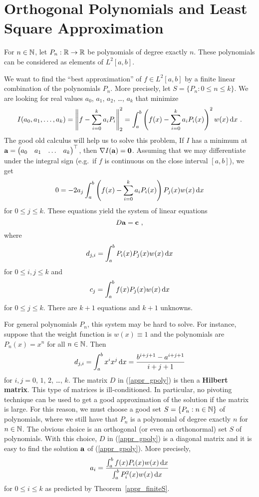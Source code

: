 \section{Orthogonal Polynomials and Least Square Approximation} 

For $n\in \mathbb{N}$, let $P_n:\mathbb{R}\rightarrow \mathbb{R}$ be polynomials of degree
exactly $n$.  These polynomials can be considered as elements of
$L^2[a,b]$.

We want to find the ``best approximation'' of $f\in L^2[a,b]$ by a finite
linear combination of the polynomials $P_n$.  More precisely, let
$\displaystyle S = \{ P_n : 0 \leq n \leq k \}$.  We are looking for 
real values $a_0$, $a_1$, $a_2$, \ldots, $a_k$ that minimize
\[
I(a_0,a_1,\ldots, a_k) = \left\| f - \sum_{i=0}^k a_i P_i \right\|_2^2
= \int_a^b \left( f(x) - \sum_{i=0}^k a_i P_i(x) \right)^2 w(x)\,\mathrm{d}x \  .
\]
The good old calculus will help us to solve this problem,  If $I$ has a
minimum at
$\displaystyle \mathbf{a} = \begin{pmatrix}
a_0 & a_1 & \ldots & a_k \end{pmatrix}^\top$,
then $\nabla I (\mathbf{a}) = \mathbf{0}$.  Assuming that we may differentiate
under the integral sign (e.g.\ if $f$ is continuous on the close interval
$[a,b]$), we get
\[
0 = -2 a_j \int_a^b \left( f(x) - \sum_{i=0}^k a_i P_i(x) \right) P_j(x)
w(x)\,\mathrm{d}x
\]
for $0 \leq j \leq k$.  These equations yield the system of
linear equations
\begin{equation} \label{appr_gpoly}
D \mathbf{a} = \mathbf{c} \ ,
\end{equation}
where
\[
  d_{j,i} = \int_a^b P_i(x) P_j(x) w(x) \,\mathrm{d}x
\]
for $0 \leq i,j \leq k$ and
\[
  c_j = \int_a^b f(x) P_j(x) w(x) \,\mathrm{d}x
\]
for $0 \leq j \leq k$.  There are $k+1$ equations and
$k+1$ unknowns.

For general polynomials $P_n$, this system may be hard to solve.  For
instance, suppose that the weight function is $w(x) \equiv 1$ and the
polynomials are $P_n(x) = x^n$ for all $n\in \mathbb{N}$.  Then
\[
d_{j,i} = \int_a^b x^i x^j \,\mathrm{d}x = \frac{b^{i+j+1} - a^{i+j+1}}{i+j+1}
\]
for $i,j = 0$, $1$, $2$, \ldots, $k$.
The matrix $D$ in (\ref{appr_gpoly}) is then a
{\bfseries Hilbert matrix}.
This type of matrices is ill-conditioned.  In particular, no pivoting
technique can be used to get a good approximation of the solution if the
matrix is large.  For this reason, we must choose a good set
$\displaystyle S = \{ P_n :n \in \mathbb{N} \}$ of polynomials, where
we still have that $P_n$ is a polynomial of degree exactly $n$ for $n\in\mathbb{N}$.
The obvious choice is an orthogonal (or even an orthonormal) set $S$ of
polynomials.  With this choice, $D$ in (\ref{appr_gpoly}) is a diagonal
matrix and it is easy to find the solution $\mathbf{a}$ of
(\ref{appr_gpoly}). More precisely,
\[
a_i = \frac{\int_a^b f(x) P_i(x) w(x) \,\mathrm{d}x}{\int_a^b P_i^2(x) w(x) \,\mathrm{d}x}
\]
for $0 \leq i \leq k$ as predicted by Theorem~\ref{appr_finiteS}.

